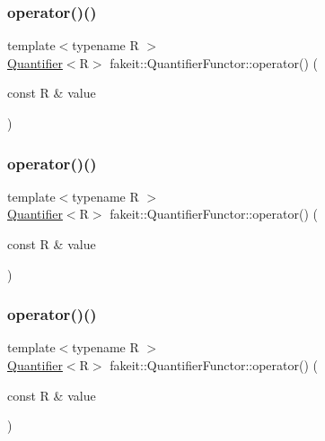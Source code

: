 \subsubsection{\texorpdfstring{operator()()}{operator()()}\hspace{0.1cm}{\footnotesize\ttfamily [3/9]}}
{\footnotesize\ttfamily template$<$typename R $>$ \\
\mbox{\hyperlink{structfakeit_1_1Quantifier}{Quantifier}}$<$R$>$ fakeit\+::\+Quantifier\+Functor\+::operator() (\begin{DoxyParamCaption}\item[{const R \&}]{value }\end{DoxyParamCaption})\hspace{0.3cm}{\ttfamily [inline]}}

\mbox{\label{structfakeit_1_1QuantifierFunctor_ae21e5262079b54f71eda7d3847967f06}} 
\subsubsection{\texorpdfstring{operator()()}{operator()()}\hspace{0.1cm}{\footnotesize\ttfamily [4/9]}}
{\footnotesize\ttfamily template$<$typename R $>$ \\
\mbox{\hyperlink{structfakeit_1_1Quantifier}{Quantifier}}$<$R$>$ fakeit\+::\+Quantifier\+Functor\+::operator() (\begin{DoxyParamCaption}\item[{const R \&}]{value }\end{DoxyParamCaption})\hspace{0.3cm}{\ttfamily [inline]}}

\mbox{\label{structfakeit_1_1QuantifierFunctor_ae21e5262079b54f71eda7d3847967f06}} 
\subsubsection{\texorpdfstring{operator()()}{operator()()}\hspace{0.1cm}{\footnotesize\ttfamily [5/9]}}
{\footnotesize\ttfamily template$<$typename R $>$ \\
\mbox{\hyperlink{structfakeit_1_1Quantifier}{Quantifier}}$<$R$>$ fakeit\+::\+Quantifier\+Functor\+::operator() (\begin{DoxyParamCaption}\item[{const R \&}]{value }\end{DoxyParamCaption})\hspace{0.3cm}{\ttfamily [inline]}}

